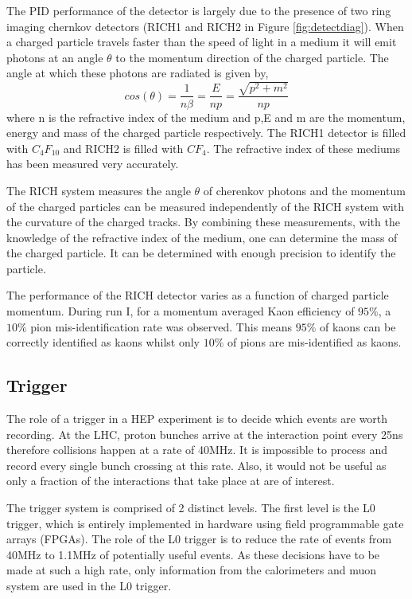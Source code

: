 The PID performance of the \lhcb detector is largely due to the presence of two ring imaging chernkov detectors (RICH1 and RICH2 in Figure \ref{fig:detectdiag}).  When a charged particle travels faster than the speed of light in a medium it will emit photons at an angle $\theta$ to the momentum direction of the charged particle.  The angle at which these photons are radiated is given by,
\begin{equation}
  cos(\theta)=\frac{1}{n\beta}=\frac{E}{np}=\frac{\sqrt{p^2+m^2}}{np}
\end{equation}
where n is the refractive index of the medium and p,E and m are the momentum, energy and mass of the charged particle respectively.  The RICH1 detector is filled with $C_4F_{10}$ and RICH2 is filled with $CF_4$.  The refractive index of these mediums has been measured very accurately.

The RICH system measures the angle $\theta$ of cherenkov photons and the momentum of the charged particles can be measured independently of the RICH system with the curvature of the charged tracks.  By combining these measurements, with the knowledge of the refractive index of the medium, one can determine the mass of the charged particle.  It can be determined with enough precision to identify the particle.

The performance of the RICH detector varies as a function of charged particle momentum.  During run I, for a momentum averaged Kaon efficiency of $95\%$, a $10\%$ pion mis-identification rate was observed.  This means $95\%$ of kaons can be correctly identified as kaons whilst only $10\%$ of pions are mis-identified as kaons\cite{Aaij:1978280}.

\subsection{Trigger}
\label{sec:Trigger}
The role of a trigger in a HEP experiment is to decide which events are worth recording.  At the LHC, proton bunches arrive at the interaction point every 25ns therefore collisions happen at a rate of 40MHz.  It is impossible to process and record every single bunch crossing at this rate.  Also, it would not be useful as only a fraction of the interactions that take place at \lhcb are of interest.

The \lhcb trigger system is comprised of 2 distinct levels.  The first level is the L0 trigger, which is entirely implemented in hardware using field programmable gate arrays (FPGAs).  The role of the L0 trigger is to reduce the rate of events from 40MHz to 1.1MHz of potentially useful events.  As these decisions have to be made at such a high rate, only information from the calorimeters and muon system are used in the L0 trigger.

